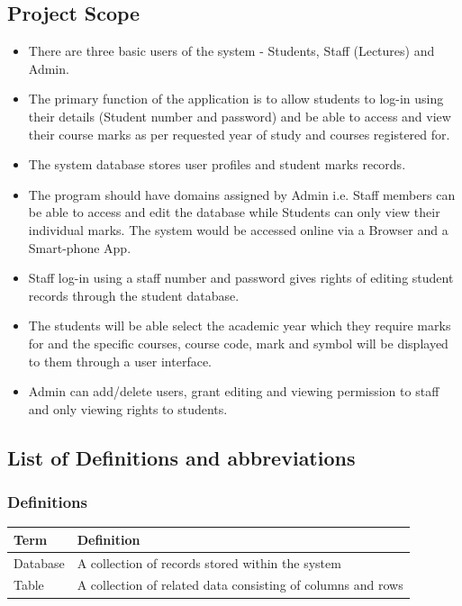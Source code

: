 \documentclass[10pt,onecolumn]{RequimentsGathering}
\begin{document}
\subsection{Project Scope}
\begin{itemize}

\item There are three basic users of the system - Students,  Staff (Lectures) and Admin.
\item The primary function of the application is to allow students to log-in using their details (Student number and password) and be able to access and view their course marks as per requested year of study and courses registered for.
\item The system database stores user profiles and student marks records.
\item The program should have domains assigned by Admin i.e. Staff members can be able to access and edit the database while Students can only view their individual marks. The system would be accessed online via a Browser and a Smart-phone App.
\item Staff log-in using a staff number and password gives rights of editing student records through the student database.
\item The students will be able select the academic year which they require marks for and the specific courses, course code, mark and symbol will be
 displayed to them through a user interface.
\item Admin can add/delete users, grant editing and viewing permission to staff and only viewing rights to students.  

\end{itemize}
\subsection{List of Definitions and abbreviations}

\subsubsection{Definitions}
\begin{center}
    \begin{tabular}{ | p{3cm} | p{9cm} |}
\hline
\textbf{Term}& \textbf{Definition}\\ \hline
 Database & A collection of records stored within the system \\ \hline
 Table & A collection of related data consisting of columns and rows \\ \hline   
     \end{tabular}
\end{center}
\end{document}
